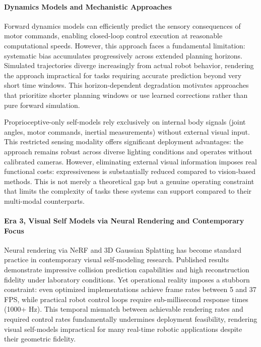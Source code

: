 ﻿\documentclass[11pt,a4paper]{article}
\begin{document}
\paragraph{Dynamics Models and Mechanistic Approaches}
Forward dynamics models can efficiently predict the sensory consequences of motor commands, enabling closed-loop control execution at reasonable computational speeds. However, this approach faces a fundamental limitation: systematic bias accumulates progressively across extended planning horizons. Simulated trajectories diverge increasingly from actual robot behavior, rendering the approach impractical for tasks requiring accurate prediction beyond very short time windows. This horizon-dependent degradation motivates approaches that prioritize shorter planning windows or use learned corrections rather than pure forward simulation.

Proprioceptive-only self-models rely exclusively on internal body signals (joint angles, motor commands, inertial measurements) without external visual input. This restricted sensing modality offers significant deployment advantages: the approach remains robust across diverse lighting conditions and operates without calibrated cameras. However, eliminating external visual information imposes real functional costs: expressiveness is substantially reduced compared to vision-based methods. This is not merely a theoretical gap but a genuine operating constraint that limits the complexity of tasks these systems can support compared to their multi-modal counterparts.

\paragraph{Era 3, Visual Self Models via Neural Rendering and Contemporary Focus}
Neural rendering via NeRF and 3D Gaussian Splatting has become standard practice in contemporary visual self-modeling research. Published results demonstrate impressive collision prediction capabilities and high reconstruction fidelity under laboratory conditions. Yet operational reality imposes a stubborn constraint: even optimized implementations achieve frame rates between 5 and 37 FPS, while practical robot control loops require sub-millisecond response times (1000+ Hz). This temporal mismatch between achievable rendering rates and required control rates fundamentally undermines deployment feasibility, rendering visual self-models impractical for many real-time robotic applications despite their geometric fidelity.
\end{document}
